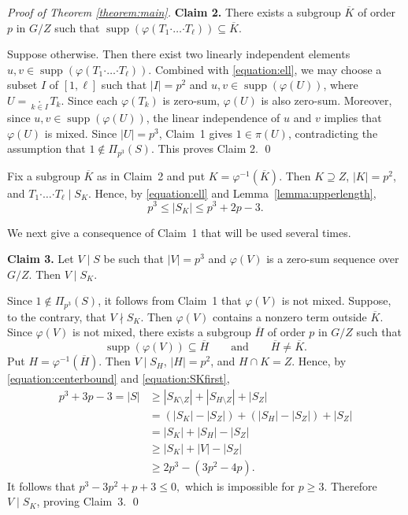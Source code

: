 \documentclass[a4paper, 12pt]{article}
\theoremstyle{definition}
\DeclareMathOperator{\supp}{supp}
\begin{document}
\begin{proof}[Proof of Theorem \ref{theorem:main}]
\medskip
\noindent\textbf{Claim 2.} There exists a subgroup $\overline K$ of order $p$ in $G/Z$ such
that
$\supp\left(\varphi(T_1\boldsymbol{\cdot}\ldots
\boldsymbol{\cdot}T_\ell)
\right)\subseteq\overline K.$

 \smallskip

 Suppose otherwise.
Then there exist two linearly
independent elements $u,v\in \supp(\varphi(T_1\boldsymbol{\cdot}\ldots\boldsymbol{\cdot}T_\ell))$.
Combined with \eqref{equation:ell}, we may choose a subset
$I$ of $[1,\ell]$ such that $|I|=p^2$
and $u,v\in \supp(\varphi(U))$, where $U=\mathop{\boldsymbol{\cdot}}\limits_{k\in I}T_k.$
Since each $\varphi(T_k)$ is zero-sum,  $\varphi(U)$ is also zero-sum.
Moreover, since $u,v\in \supp(\varphi(U))$, the linear
independence of $u$ and $v$ implies that
$\varphi(U)$ is mixed. Since
$|U|=p^3$, Claim~1 gives $1\in\pi(U)$, contradicting
the assumption that $1\notin\Pi_{p^3}(S)$. This proves Claim 2. \qed

Fix a subgroup $\overline K$ as in Claim~2 and put
$K=\varphi^{-1}(\overline K)$.
Then $K\supseteq Z$, $|K|=p^2$, and
$T_1\boldsymbol{\cdot}\ldots\boldsymbol{\cdot}T_\ell\mid S_K$.
Hence, by \eqref{equation:ell} and Lemma~\ref{lemma:upperlength},
\begin{equation}\label{equation:SKfirst}
p^3\le |S_K|\le p^3+2p-3.
\end{equation}



We next give a consequence of Claim~1 that will be used several
times.

\medskip
\noindent\textbf{Claim 3.}
Let $V\mid S$ be such that $|V|=p^3$ and $\varphi(V)$ is a zero-sum
sequence over $G/Z$. Then
$V\mid S_K.$

\smallskip

Since $1\notin\Pi_{p^3}(S)$, it follows from Claim~1 that
$\varphi(V)$ is not mixed. Suppose, to the contrary, that
$V\nmid S_K$. Then $\varphi(V)$ contains a nonzero term outside
$\overline K$. Since $\varphi(V)$ is not mixed, there exists a
subgroup $\overline H$ of order $p$ in $G/Z$ such that
$$
\supp(\varphi(V))\subseteq\overline H
\qquad\text{and}\qquad
\overline H\ne\overline K.
$$
Put $H=\varphi^{-1}(\overline H)$. Then $V\mid S_H$,
$|H|=p^2$, and $H\cap K=Z$. Hence, by
\eqref{equation:centerbound} and \eqref{equation:SKfirst},
$$\begin{aligned}
p^3+3p-3=|S|
&\ge |S_{K\setminus Z}|+|S_{H\setminus Z}|+|S_Z|\\
&=(|S_K|-|S_Z|)+(|S_H|-|S_Z|)+|S_Z|\\
&=|S_K|+|S_H|-|S_Z|\\
&\ge |S_K|+|V|-|S_Z|\\
&\ge 2p^3-(3p^2-4p).
\end{aligned}$$
It follows that
$p^3-3p^2+p+3\leq0,$
which is impossible for $p\ge3$. Therefore $V\mid S_K$, proving
Claim~3. \qed



\end{proof}
\end{document}
